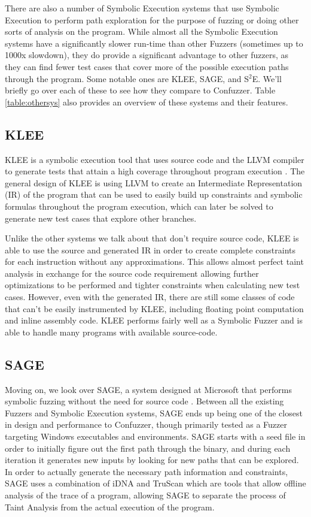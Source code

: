 There are also a number of Symbolic Execution systems that use Symbolic
Execution to perform path exploration for the purpose of fuzzing or doing other
sorts of analysis on the program. While almost all the Symbolic Execution
systems have a significantly slower run-time than other Fuzzers (sometimes up to
1000x slowdown), they do provide a significant advantage to other fuzzers, as
they can find fewer test cases that cover more of the possible execution paths
through the program. Some notable ones are KLEE, SAGE, and S$^2$E. We'll briefly go
over each of these to see how they compare to Confuzzer. Table
\ref{table:othersys} also provides an overview of these systems and their
features.

\subsection{KLEE}
KLEE is a symbolic execution tool that uses source code and the LLVM compiler to
generate tests that attain a high coverage throughout program execution
\cite{klee}. The general design of KLEE is using LLVM to create an Intermediate
Representation (IR) of the program that can be used to easily build up constraints
and symbolic formulas throughout the program execution, which can later be
solved to generate new test cases that explore other branches.

Unlike the other systems we talk about that don't require source code, KLEE is
able to use the source and generated IR in order to create complete constraints
for each instruction without any approximations. This allows almost perfect
taint analysis in exchange for the source code requirement allowing further
optimizations to be performed and tighter constraints when calculating new test
cases. However, even with the generated IR, there are still some classes of code
that can't be easily instrumented by KLEE, including floating point computation
and inline assembly code. KLEE performs fairly well as a Symbolic Fuzzer and is
able to handle many programs with available source-code.

\subsection{SAGE}
Moving on, we look over SAGE, a system designed at Microsoft that performs
symbolic fuzzing without the need for source code \cite{sage}. Between
all the existing Fuzzers and Symbolic Execution systems, SAGE ends up being one
of the closest in design and performance to Confuzzer, though primarily tested
as a Fuzzer targeting Windows executables and environments. SAGE starts with a
seed file in order to initially figure out the first path through the binary,
and during each iteration it generates new inputs by looking for new paths that
can be explored. In order to actually generate the necessary path information
and constraints, SAGE uses a combination of iDNA and TruScan which are tools
that allow offline analysis of the trace of a program, allowing SAGE to separate
the process of Taint Analysis from the actual execution of the program.

